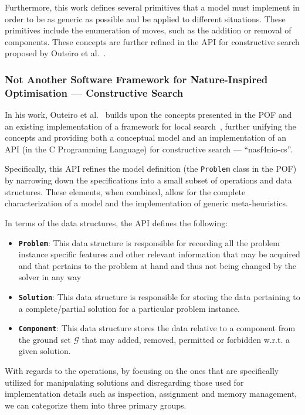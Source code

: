 Furthermore, this work defines several primitives that a model must implement in
order to be as generic as possible and be applied to different situations. These
primitives include the enumeration of moves, such as the addition or removal of
components. These concepts are further refined in the API for constructive
search proposed by Outeiro et al.~\cite{outeiro2021application}.

\subsubsection{Not Another Software Framework for Nature-Inspired Optimisation
  --- Constructive Search}

In his work, Outeiro et al.~\cite{outeiro2021application} builds upon the
concepts presented in the POF and an existing implementation of a framework for
local search~\cite{fonseca2021nasf4nio}, further unifying the concepts and
providing both a conceptual model and an implementation of an API (in the C
Programming Language) for constructive search --- ``nasf4nio-cs''.

Specifically, this API refines the model definition (the \texttt{Problem} class
in the POF) by narrowing down the specifications into a small subset of
operations and data structures. These elements, when combined, allow for the
complete characterization of a model and the implementation of generic
meta-heuristics.

In terms of the data structures, the API defines the following:

\begin{itemize}
  \item \textbf{\texttt{Problem}}: This data structure is responsible for recording
        all the problem instance specific features and other relevant information
        that may be acquired and that pertains to the problem at hand and thus not
        being changed by the solver in any way
  \item \textbf{\texttt{Solution}}: This data structure is responsible for storing the
        data pertaining to a complete/partial solution for a particular problem
        instance.
  \item \textbf{\texttt{Component}}: This data structure stores the data relative to a
        component from the ground set $\mathcal{G}$ that may added, removed, permitted
        or forbidden w.r.t. a given solution.
\end{itemize}

With regards to the operations, by focusing on the ones that are specifically
utilized for manipulating solutions and disregarding those used for
implementation details such as inspection, assignment and memory management, we can
categorize them into three primary groups.

